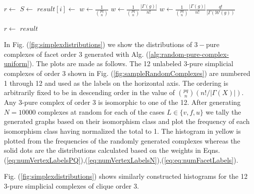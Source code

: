 \documentclass[12pt]{article}
\theoremstyle{plain}
\theoremstyle{definition}
\theoremstyle{remark}
\begin{document}
 \begin{algorithm}
 \caption{\label{alg:random-pure-complex-uniform}Generates a random pure complex from $\mathcal{Y}_L(p,q)$ with a uniform distribution.}
    \begin{algorithmic}[1]
        \State $r \gets$ 
        \State $S \gets $ 
        \State$result[i] \gets$  
        \EndFor
                \State $w \gets \frac{1}{\binom{pq}{n}}$
                \State $w \gets \frac{1}{\binom{pq}{n}}\frac{|\Gamma(g)|}{n!}$
                \State $w \gets \frac{1}{\binom{pq}{n}}\frac{|\Gamma(g)|}{n!} \frac{q!}{|\Gamma(\mathcal{W}(g))}$
            \EndIf

            \State $r \gets $
                \State\Return $result$
                \Else
                \State{}
                \EndIf
        \EndFunction
     \end{algorithmic}
 \end{algorithm}


In Fig. (\ref{fig:simplexdistributions})  we show the distributions of $3-$pure complexes of facet order $3$ generated with Alg. (\ref{alg:random-pure-complex-uniform}). The plots are made as follows. The 12 unlabeled 3-pure simplicial complexes of order 3 shown in Fig. (\ref{fig:sampleRandomComplexes}) are numbered 1 through 12 and used as the labels on the horizontal axis. The ordering is arbitrarily fixed to be in descending order in the value of $\binom{pq}{n}(n!/|\Gamma(X)|)$. Any 3-pure complex of order 3 is isomorphic to one of the 12. After generating $N=10000$ complexes at random for each of the cases $L\in\{v,f,u\}$ we tally the generated graphs based on their isomorphism class and plot the frequency of each isomorphism class having normalized the total to 1. The histogram in yellow is plotted from the frequencies of the randomly generated complexes whereas the solid dots are the distributions calculated based on the weights in Eqns. (\ref{eq:numVertexLabelsPQ}),(\ref{eq:numVertexLabelsN}),(\ref{eq:eq:numFacetLabels}).

Fig. (\ref{fig:simplexdistributions}) shows similarly constructed histograms for the 12 3-pure simplicial complexes of clique order 3.
\end{document}
